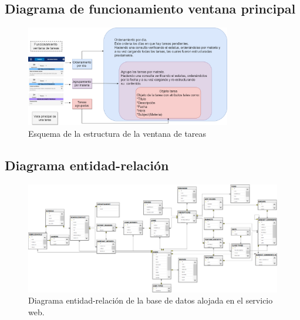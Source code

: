 \documentclass[10pt]{article}
\begin{document}
\subsection{Diagrama de funcionamiento ventana principal}
\begin{figure}[H]
    \begin{center}
    \includegraphics[width=0.8\textwidth]{Imagenes/DiagramaTareas.png}
    \caption{Esquema de la estructura de la ventana de tareas}
\label{fig1}
    \end{center}
\end{figure} 
\begin{landscape}
\subsection{Diagrama entidad-relación}
\begin{figure}[h]
\centering
    \begin{center}
    \includegraphics[width=1.3\textwidth]{Imagenes/diagrama.png}
    \caption{Diagrama entidad-relación de la base de datos alojada en el servicio web.}
\label{fig1}
    \end{center}
\end{figure} 
\end{landscape}
\newpage
\end{document}
